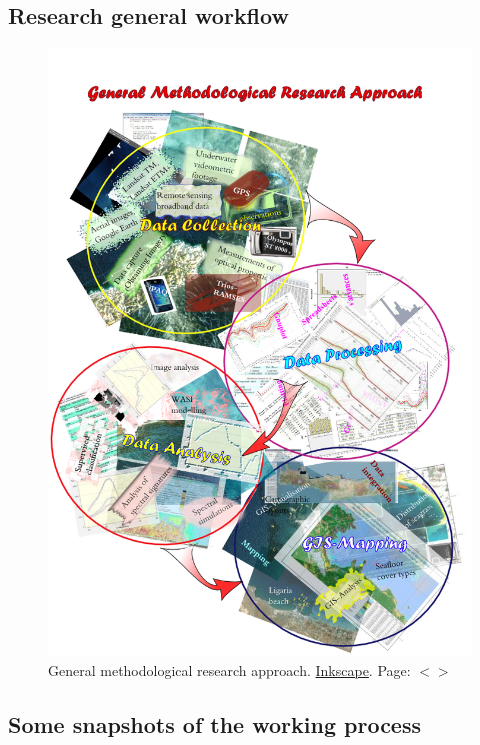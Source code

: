 \documentclass[11pt]{article}
\begin{document}
\begin{appendices}
\pagebreak
\newpage

\subsection{Research general workflow}
\begin{figure}[H]
	\centering
	\includegraphics[scale=0.57]{UML_GIS.png}
	\caption{General methodological research approach. \href{http://inkscape.org/}{Inkscape}. Page: $<$\pageref{page-9}$>$}
	\label{fig:1.11}
\end{figure}
\pagebreak

\subsection{Some snapshots of the working process}


\end{appendices}
\end{document}
